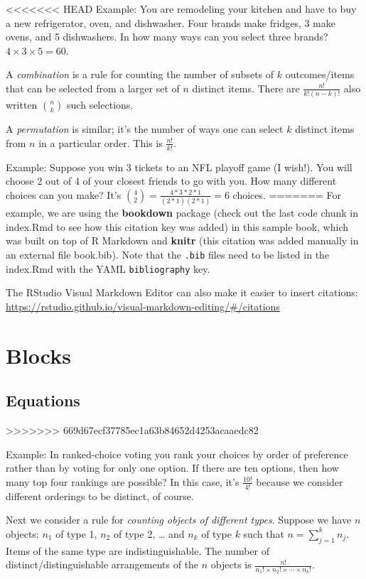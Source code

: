 \documentclass[]{book}
\begin{document}
<<<<<<< HEAD
Example: You are remodeling your kitchen and have to buy a new
refrigerator, oven, and dishwasher. Four brands make fridges, 3 make
ovens, and 5 dishwashers. In how many ways can you select three brands?
\(4\times 3\times 5 = 60\).

A \emph{combination} is a rule for counting the number of subsets of
\(k\) outcomes/items that can be selected from a larger set of \(n\)
distinct items. There are \(\frac{n!}{k!(n-k)!}\) also written
\({n \choose k}\) such selections.

A \emph{permutation} is similar; it's the number of ways one can select
\(k\) distinct items from \(n\) in a particular order. This is
\(\frac{n!}{k!}\).

Example: Suppose you win 3 tickets to an NFL playoff game (I wish!). You
will choose 2 out of 4 of your closest friends to go with you. How many
different choices can you make? It's
\({4\choose 2} = \frac{4*3*2*1}{(2*1)(2*1) } = 6\) choices.
=======
For example, we are using the \textbf{bookdown} package
\citep{R-bookdown} (check out the last code chunk in index.Rmd to see
how this citation key was added) in this sample book, which was built on
top of R Markdown and \textbf{knitr} \citep{xie2015} (this citation was
added manually in an external file book.bib). Note that the
\texttt{.bib} files need to be listed in the index.Rmd with the YAML
\texttt{bibliography} key.

The RStudio Visual Markdown Editor can also make it easier to insert
citations:
\url{https://rstudio.github.io/visual-markdown-editing/\#/citations}

\chapter{Blocks}\label{blocks}

\section{Equations}\label{equations}
>>>>>>> 669d67ecf37785ec1a63b84652d4253acaaedc82

Example: In ranked-choice voting you rank your choices by order of
preference rather than by voting for only one option. If there are ten
options, then how many top four rankings are possible? In this case,
it's \(\frac{10!}{4!}\) because we consider different orderings to be
distinct, of course.

Next we consider a rule for \emph{counting objects of different types}.
Suppose we have \(n\) objects: \(n_1\) of type 1, \(n_2\) of type 2,
\ldots{} and \(n_k\) of type \(k\) such that \(n=\sum_{j=1}^k n_j\).
Items of the same type are indistinguishable. The number of
distinct/distinguishable arrangements of the \(n\) objects is
\(\frac{n!}{n_1!\times n_2! \times \cdots \times n_k! }\).
\end{document}
